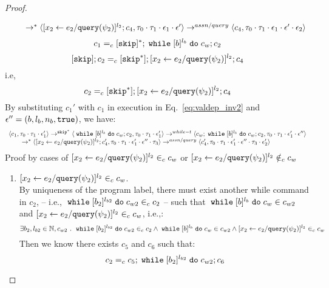 {\begin{proof}
\begin{subproof}
\[\begin{array}{l}
  \qquad \rightarrow^{*} 
  \langle [\mathrel{ {x}_2 \leftarrow e_2 / {\tt query}(\psi_2) }]^{l_2};{c}_4, 
  \mathtt{\tau}_0 \cdot \mathtt{\tau}_1 \cdot \mathtt{\epsilon}_1 \cdot \mathtt{\epsilon}' \rangle 
  \rightarrow^{assn/query} 
  \langle {c}_4,  \mathtt{\tau}_0 \cdot \mathtt{\tau}_1 \cdot \mathtt{\epsilon}_1 \cdot \mathtt{\epsilon}' \cdot \mathtt{\epsilon}_2 \rangle 
  \end{array}
\]
%
\[
  c_1 =_c [\mathtt{skip}]{}^*; \;\mathtt{while}\; [b]^{l_b} \;\mathtt{do}\; c_w;{c}_2
\]
% 
\[
  [\mathtt{skip}]; c_2 =_c [\mathtt{skip}^*];[\mathrel{ {x}_2 \leftarrow e_2 / {\tt query}(\psi_2) }]^{l_2};{c}_4
\]
i.e,
\[
  c_2 =_c [\mathtt{skip}^*];[\mathrel{ {x}_2 \leftarrow e_2 / {\tt query}(\psi_2) }]^{l_2};{c}_4
\]
%
By substituting $c_1'$ with $c_1$ in execution in Eq.~\ref{eq:valdep_inv2} and $\mathtt{\epsilon}'' = (b, l_b, n_b, \mathtt{true})$, we have:
  \begin{equation}
  \label{eq:m1testwhile_inv2}
  \begin{array}{l}   
  \langle c_1, \mathtt{\tau}_0 \cdot \mathtt{\tau}_1 \cdot \mathtt{\epsilon}_1' \rangle 
  \rightarrow^{\mathtt{skip}^*} 
  \langle \;\mathtt{while}\; [b]^{l_b} \;\mathtt{do}\; c_w;{c}_2, \mathtt{\tau}_0 \cdot \mathtt{\tau}_1 \cdot \mathtt{\epsilon}_1' \rangle 
  \rightarrow^{while-t} 
  \langle c_w;\;\mathtt{while}\; [b]^{l_b} \;\mathtt{do}\; c_w;c_2, \mathtt{\tau}_0 \cdot \mathtt{\tau}_1 \cdot \mathtt{\epsilon}_1' \cdot \mathtt{\epsilon}'' \rangle 
  \\
  \qquad \rightarrow^{*} 
  \langle [\mathrel{ {x}_2 \leftarrow e_2 / {\tt query}(\psi_2) }]^{l_2};{c}_4', 
  \mathtt{\tau}_0 \cdot \mathtt{\tau}_1 \cdot \mathtt{\epsilon}_1' \cdot \mathtt{\epsilon}'' \cdot \mathtt{\tau}_3 \rangle
  \rightarrow^{assn/query} 
  \langle {c}_4',  \mathtt{\tau}_0 \cdot \mathtt{\tau}_1 \cdot \mathtt{\epsilon}_1' \cdot \mathtt{\epsilon}'' \cdot \mathtt{\tau}_3 \cdot \mathtt{\epsilon}_2' \rangle 
\end{array}
\end{equation}
%
Proof by cases of $[\mathrel{ {x}_2 \leftarrow e_2 / {\tt query}(\psi_2) }]^{l_2} \in_c c_w$ or 
$[\mathrel{ {x}_2 \leftarrow e_2 / {\tt query}(\psi_2) }]^{l_2} \notin_c c_w$
\begin{enumerate}
  \item $[\mathrel{ {x}_2 \leftarrow e_2 / {\tt query}(\psi_2) }]^{l_2} \in_c c_w$.
  \\
  By uniqueness of the program label, there must exist another while command in $c_2$, -- i.e., $\;\mathtt{while}\; [b_2]^{l_{b2}} \;\mathtt{do}\; c_{w2} \in_c c_2$ --
    such that 
  $\;\mathtt{while}\; [b]^{l_b} \;\mathtt{do}\; c_w \in c_{w2}$ and $[\mathrel{ {x}_2 \leftarrow e_2 / {\tt query}(\psi_2) }]^{l_2} \in_c c_w$, i.e.,:
  \[
  \exists b_2, l_{b2} \in \mathbb{N}, c_{w2} ~.~ 
  \;\mathtt{while}\; [b_2]^{l_{b2}} \;\mathtt{do}\; c_{w2} \in_c c_2 
  \land \;\mathtt{while}\; [b]^{l_b} \;\mathtt{do}\; c_w \in c_{w2}
  \land [\mathrel{ {x}_2 \leftarrow e_2 / {\tt query}(\psi_2) }]^{l_2} \in_c c_w
  \]
%
Then we know there exists $c_5$ and $c_6$ such that:
\[
  c_2 =_c c_5; \;\mathtt{while}\; [b_2]^{l_{b2}} \;\mathtt{do}\; c_{w2};c_6
\]
\end{enumerate}
\end{subproof}
\end{proof}}
